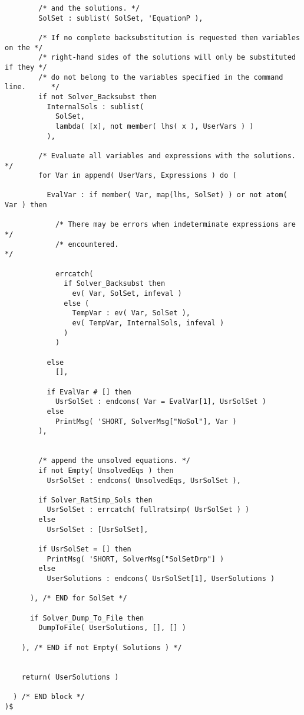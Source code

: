 \begin{verbatim}
        /* and the solutions. */
        SolSet : sublist( SolSet, 'EquationP ),

        /* If no complete backsubstitution is requested then variables on the */
        /* right-hand sides of the solutions will only be substituted if they */
        /* do not belong to the variables specified in the command line.      */
        if not Solver_Backsubst then
          InternalSols : sublist(
            SolSet,
            lambda( [x], not member( lhs( x ), UserVars ) )
          ),

        /* Evaluate all variables and expressions with the solutions. */
        for Var in append( UserVars, Expressions ) do (

          EvalVar : if member( Var, map(lhs, SolSet) ) or not atom( Var ) then

            /* There may be errors when indeterminate expressions are */
            /* encountered.                                           */

            errcatch(
              if Solver_Backsubst then
                ev( Var, SolSet, infeval )
              else (
                TempVar : ev( Var, SolSet ),
                ev( TempVar, InternalSols, infeval )
              )
            )

          else
            [],

          if EvalVar # [] then
            UsrSolSet : endcons( Var = EvalVar[1], UsrSolSet )
          else
            PrintMsg( 'SHORT, SolverMsg["NoSol"], Var )
        ),


        /* append the unsolved equations. */
        if not Empty( UnsolvedEqs ) then
          UsrSolSet : endcons( UnsolvedEqs, UsrSolSet ),

        if Solver_RatSimp_Sols then
          UsrSolSet : errcatch( fullratsimp( UsrSolSet ) )
        else
          UsrSolSet : [UsrSolSet],

        if UsrSolSet = [] then
          PrintMsg( 'SHORT, SolverMsg["SolSetDrp"] )
        else
          UserSolutions : endcons( UsrSolSet[1], UserSolutions )

      ), /* END for SolSet */

      if Solver_Dump_To_File then
        DumpToFile( UserSolutions, [], [] )

    ), /* END if not Empty( Solutions ) */


    return( UserSolutions )

  ) /* END block */
)$



\end{verbatim}
